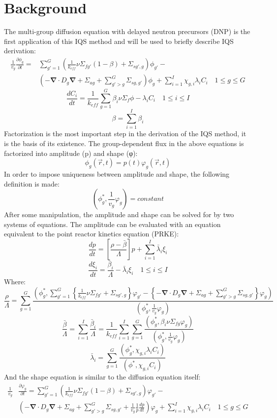 \documentclass[11pt]{scrartcl}
\renewcommand{\div}{\bs{\nabla}\! \cdot \!}
\newcommand{\grad}{\bs{\nabla}}
\newcommand{\bs}[1]{\mathbf{#1}}
\newcommand{\be}{\begin{equation}}
\newcommand{\ee}{\end{equation}}
\begin{document}
\section{Background}
The multi-group diffusion equation with delayed neutron precursors (DNP) is the first application of this IQS method and will be used to briefly describe IQS derivation:
\begin{align}
\frac{1}{v_g} \frac{\partial \phi_g }{\partial t} =& \sum_{g'=1}^G\left(\frac{1}{k_{eff}}\nu \Sigma_{fg'}(1-\beta)+\Sigma_{sg',g}\right) \phi_{g'} - \nonumber \\
& \left( -\div D_g \grad  + \Sigma_{ag}  + \sum_{g'>g}^G\Sigma_{sg,g'} \right)\phi_g + \sum_{i=1}^I\chi_{g,i}\lambda_i C_i \quad 1 \le g \le G 
\end{align}
\be
\frac{dC_i}{dt} = \frac{1}{k_{eff}}\sum_{g=1}^G\beta_i\nu \Sigma_f \phi - \lambda_i C_i \quad 1 \le i \le I 
\ee
\be
\beta = \sum_{i=1}^I \beta_i 
\ee
Factorization is the most important step in the derivation of the IQS method, it is the basis of its existence.  The group-dependent flux in the above equations is factorized into amplitude (p) and shape (φ):
\be
\phi_g(\vec{r},t)=p(t)\varphi_g(\vec{r},t)
\ee
In order to impose uniqueness between amplitude and shape, the following definition is made:
\be
\left(\phi_g^*,\frac{1}{v_g}\varphi_g\right)=constant
\ee
After some manipulation, the amplitude and shape can be solved for by two systems of equations.  The amplitude can be evaluated with an equation equivalent to the point reactor kinetics equation (PRKE):
\be
\frac{dp}{dt}=\left[\frac{\rho-\bar{\beta}}{\Lambda}\right]p+\sum_{i=1}^I\bar{\lambda}_i\xi_i
\ee
\be
\frac{d\xi_i}{dt}=\frac{\bar{\beta}_i}{\Lambda}-\bar{\lambda}_i\xi_i \quad 1 \le i \le I 
\ee
Where:
\be
\frac{\rho}{\Lambda}=\sum_{g=1}^G\frac{ \left(\phi_g^*,\sum_{g'=1}^G\left\{\frac{1}{k_{eff}} \nu \Sigma_{fg'}+\Sigma_{sg',g}\right\}\varphi_{g'} -\left\{ -\div D_g \grad+\Sigma_{ag}+\sum_{g'>g}^G\Sigma_{sg,g'}\right\}\varphi_g\right)}{\left(\phi_g^*,\frac{1}{v_g}\varphi_g\right)}
\ee
\be
\frac{\bar{\beta}}{\Lambda}=\sum_{i=1}^I\frac{\bar{\beta}_i}{\Lambda}=\frac{1}{k_{eff}}\sum_{i=1}^I\sum_{g=1}^G\frac{(\phi_g^*,\beta_i\nu\Sigma_{fg}\varphi_g)}{\left(\phi_g^*,\frac{1}{v_g}\varphi_g\right)}
\ee
\be
\bar{\lambda}_i=\sum_{g=1}^G\frac{(\phi_g^*,\chi_{g,i}\lambda_iC_i)}{(\phi^*,\chi_{g,i}C_i)}
\ee
And the shape equation is similar to the diffusion equation itself:
\begin{align}
\frac{1}{v_g}& \frac{\partial \varphi_g }{\partial t} = \sum_{g'=1}^G\left(\frac{1}{k_{eff}}\nu \Sigma_{fg'}(1-\beta)+\Sigma_{sg',g}\right) \varphi_{g'} - \nonumber \\
& \left( -\div D_g \grad  + \Sigma_{ag}  + \sum_{g'>g}^G\Sigma_{sg,g'} + \frac{1}{v_g}\frac{1}{p}\frac{dp}{dt} \right)\varphi_g + \sum_{i=1}^I\chi_{g,i}\lambda_i C_i \quad 1 \le g \le G 
\label{eq:shape}
\end{align}
\end{document}
